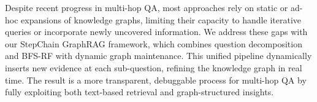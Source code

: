 \documentclass[runningheads]{llncs}
\begin{document}

Despite recent progress in multi-hop QA, most approaches rely on static or ad-hoc expansions of knowledge graphs, limiting their capacity to handle iterative queries or incorporate newly uncovered information. We address these gaps with our StepChain GraphRAG framework, which combines question decomposition and BFS-RF with dynamic graph maintenance. This unified pipeline dynamically inserts new evidence at each sub-question, refining the knowledge graph in real time. The result is a more transparent, debuggable process for multi-hop QA by fully exploiting both text-based retrieval and graph-structured insights.


\end{document}
